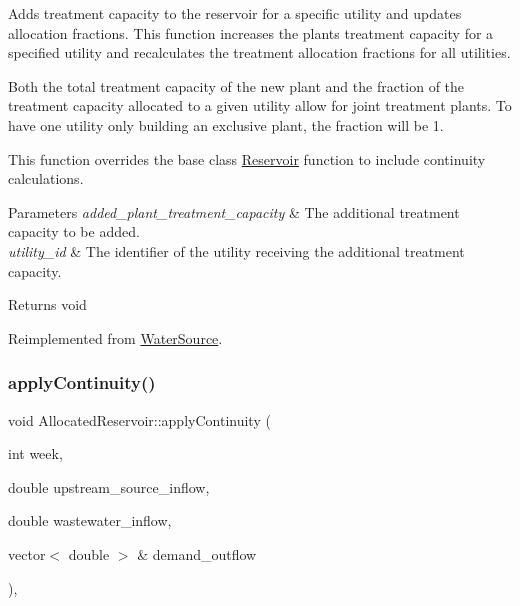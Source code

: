 Adds treatment capacity to the reservoir for a specific utility and updates allocation fractions. This function increases the plant\textquotesingle{}s treatment capacity for a specified utility and recalculates the treatment allocation fractions for all utilities. 

Both the total treatment capacity of the new plant and the fraction of the treatment capacity allocated to a given utility allow for joint treatment plants. To have one utility only building an exclusive plant, the fraction will be 1.

This function overrides the base class {\ttfamily \mbox{\hyperlink{classReservoir}{Reservoir}}} function to include continuity calculations.


\begin{DoxyParams}{Parameters}
{\em added\+\_\+plant\+\_\+treatment\+\_\+capacity} & The additional treatment capacity to be added. \\
\hline
{\em utility\+\_\+id} & The identifier of the utility receiving the additional treatment capacity.\\
\hline
\end{DoxyParams}
\begin{DoxyReturn}{Returns}
void 
\end{DoxyReturn}


Reimplemented from \mbox{\hyperlink{classWaterSource_ac2bc1a09fce3a3201d62a73052b27b0b}{Water\+Source}}.

\mbox{\label{classAllocatedReservoir_aa5a3683ac3a1e7a778627332c6a7fff7}} 
\subsubsection{\texorpdfstring{apply\+Continuity()}{applyContinuity()}}
{\footnotesize\ttfamily void Allocated\+Reservoir\+::apply\+Continuity (\begin{DoxyParamCaption}\item[{int}]{week,  }\item[{double}]{upstream\+\_\+source\+\_\+inflow,  }\item[{double}]{wastewater\+\_\+inflow,  }\item[{vector$<$ double $>$ \&}]{demand\+\_\+outflow }\end{DoxyParamCaption})\hspace{0.3cm}{\ttfamily [override]}, {\ttfamily [virtual]}}



